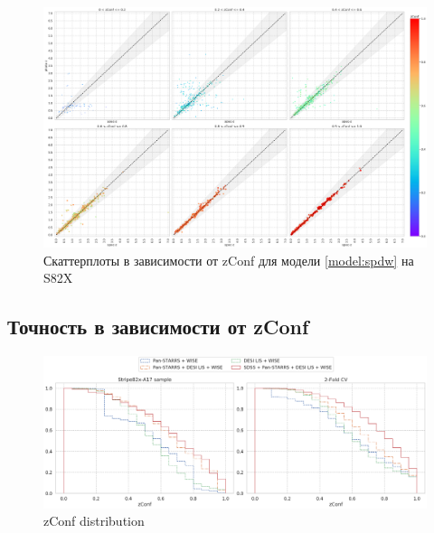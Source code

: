 \documentclass[fleqn,usenatbib]{mnras}
\begin{document}
\begin{figure}
    \centering
    \includegraphics[width=0.99\linewidth]{images/zconf-scatterplot-35-s82x.png}
    \caption{Скаттерплоты в зависимости от zConf для модели \ref{model:spdw} на S82X}
    \label{fig:zconf-scatterplot-35}
\end{figure}

\subsection{Точность в зависимости от zConf}

\begin{figure}
    \centering
    \includegraphics[width=0.9\linewidth]{images/zconf-cal.png}
    \caption{zConf distribution}
    \label{fig:zconf-cal-dr16q}
\end{figure}
\end{document}
